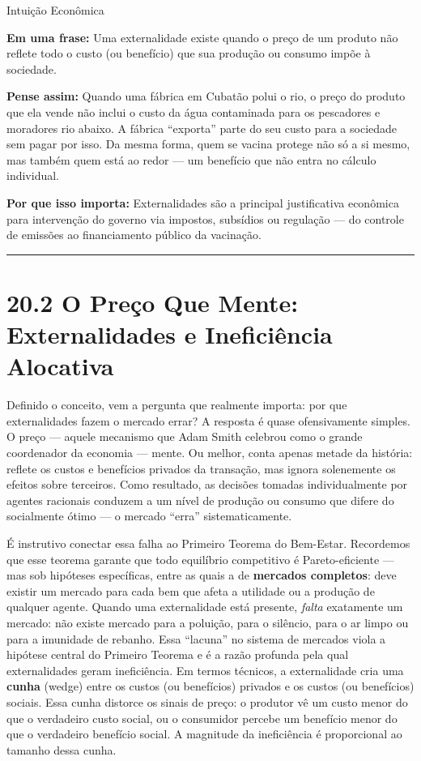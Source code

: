 \documentclass[11pt,twoside,openright]{book}
\begin{document}
\begin{intuitionbox}{Intuição Econômica}

\textbf{Em uma frase:} Uma externalidade existe quando o preço de um
produto não reflete todo o custo (ou benefício) que sua produção ou
consumo impõe à sociedade.

\textbf{Pense assim:} Quando uma fábrica em Cubatão polui o rio, o preço
do produto que ela vende não inclui o custo da água contaminada para os
pescadores e moradores rio abaixo. A fábrica ``exporta'' parte do seu
custo para a sociedade sem pagar por isso. Da mesma forma, quem se
vacina protege não só a si mesmo, mas também quem está ao redor --- um
benefício que não entra no cálculo individual.

\textbf{Por que isso importa:} Externalidades são a principal
justificativa econômica para intervenção do governo via impostos,
subsídios ou regulação --- do controle de emissões ao financiamento
público da vacinação.

\end{intuitionbox}

\begin{center}\rule{0.5\linewidth}{0.5pt}\end{center}

\section{20.2 O Preço Que Mente: Externalidades e Ineficiência
Alocativa}\label{202}

Definido o conceito, vem a pergunta que realmente importa: por que
externalidades fazem o mercado errar? A resposta é quase ofensivamente
simples. O preço --- aquele mecanismo que Adam Smith celebrou como o
grande coordenador da economia --- mente. Ou melhor, conta apenas metade
da história: reflete os custos e benefícios privados da transação, mas
ignora solenemente os efeitos sobre terceiros. Como resultado, as
decisões tomadas individualmente por agentes racionais conduzem a um
nível de produção ou consumo que difere do socialmente ótimo --- o
mercado ``erra'' sistematicamente.

É instrutivo conectar essa falha ao Primeiro Teorema do Bem-Estar.
Recordemos que esse teorema garante que todo equilíbrio competitivo é
Pareto-eficiente --- mas sob hipóteses específicas, entre as quais a de
\textbf{mercados completos}: deve existir um mercado para cada bem que
afeta a utilidade ou a produção de qualquer agente. Quando uma
externalidade está presente, \emph{falta} exatamente um mercado: não
existe mercado para a poluição, para o silêncio, para o ar limpo ou para
a imunidade de rebanho. Essa ``lacuna'' no sistema de mercados viola a
hipótese central do Primeiro Teorema e é a razão profunda pela qual
externalidades geram ineficiência. Em termos técnicos, a externalidade
cria uma \textbf{cunha} (wedge) entre os custos (ou benefícios) privados
e os custos (ou benefícios) sociais. Essa cunha distorce os sinais de
preço: o produtor vê um custo menor do que o verdadeiro custo social, ou
o consumidor percebe um benefício menor do que o verdadeiro benefício
social. A magnitude da ineficiência é proporcional ao tamanho dessa
cunha.
\end{document}
